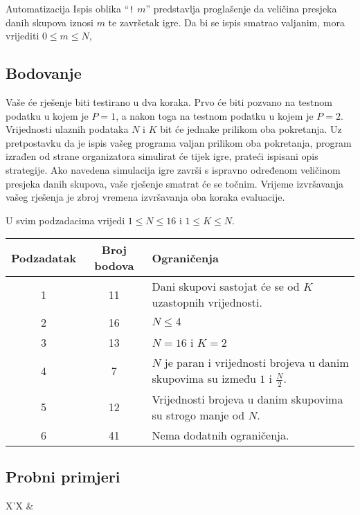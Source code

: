 \begin{statement}[
  problempoints=100,
  timelimit=1 sekunda,
  memorylimit=512 MiB,
]{Automatizacija}
Ispis oblika “\texttt{!} $m$” predstavlja proglašenje da veličina presjeka danih skupova 
iznosi $m$ te završetak igre. 
Da bi se ispis smatrao valjanim, mora vrijediti $0 \leq m \leq N$, 

\subsection*{Bodovanje}

Vaše će rješenje biti testirano u dva koraka. 
Prvo će biti pozvano na testnom podatku u kojem je $P = 1$, a nakon toga 
na testnom podatku u kojem je $P = 2$. 
Vrijednosti ulaznih podataka $N$ i $K$ bit će jednake prilikom oba pokretanja. 
Uz pretpostavku da je ispis vašeg programa valjan prilikom oba pokretanja, 
program izrađen od strane organizatora simulirat će tijek igre, prateći 
ispisani opis strategije. 
Ako navedena simulacija igre završi 
s ispravno određenom veličinom presjeka danih skupova, vaše rješenje 
smatrat će se točnim.
Vrijeme izvršavanja vašeg rješenja je zbroj vremena izvršavanja oba koraka evaluacije. 

U svim podzadacima vrijedi $1 \leq N \leq 16$ i $1 \leq K \leq N$.

{\renewcommand{\arraystretch}{1.4}
  \setlength{\tabcolsep}{6pt}
  \begin{tabular}{ccl}
   Podzadatak & Broj bodova & Ograničenja \\ \midrule
    1 & 11 & Dani skupovi sastojat će se od $K$ uzastopnih vrijednosti. \\
    2 & 16 & $N \leq 4$ \\
    3 & 13 & $N = 16$ i $K = 2$ \\
    4 & 7 & $N$ je paran i vrijednosti brojeva u danim skupovima su između $1$ i $\frac{N}{2}$. \\
    5 & 12 & Vrijednosti brojeva u danim skupovima su strogo manje od $N$. \\
    6 & 41 & Nema dodatnih ograničenja.
\end{tabular}}

\subsection*{Probni primjeri}
\begin{tabularx}{\textwidth}{X'X}
 &
\end{tabularx}


\end{statement}
